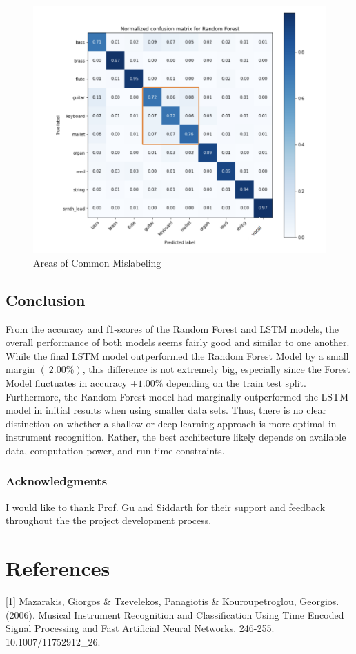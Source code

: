 \documentclass{article}
\begin{document}
\begin{figure}[htb]
  \centering
  \includegraphics[width=.6\linewidth]{mislabel}
  \caption{Areas of Common Mislabeling}
\end{figure}

\subsection{Conclusion}

From the accuracy and f1-scores of the Random Forest and LSTM models, the overall performance of both models seems fairly good and similar to one another. While the final LSTM model outperformed the Random Forest Model by a small margin $(~2.00\%)$, this difference is not extremely big, especially since the Forest Model fluctuates in accuracy $\pm1.00\%$ depending on the train test split. Furthermore, the Random Forest model had marginally outperformed the LSTM model in initial results when using smaller data sets. Thus, there is no clear distinction on whether a shallow or deep learning approach is more optimal in instrument recognition. Rather, the best architecture likely depends on available data, computation power, and run-time constraints.

\subsubsection*{Acknowledgments}

I would like to thank Prof. Gu and Siddarth for their support and
feedback throughout the the project development
process.

\section*{References}

[1] Mazarakis, Giorgos & Tzevelekos, Panagiotis & Kouroupetroglou, Georgios. (2006). Musical Instrument Recognition and Classification Using Time Encoded Signal Processing and Fast Artificial Neural Networks. 246-255. 10.1007/11752912\_26. 
\end{document}
